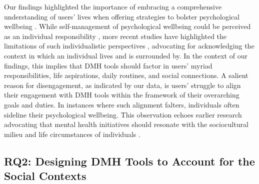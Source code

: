 Our findings highlighted the importance of embracing a comprehensive understanding of users' lives when offering strategies to bolster psychological wellbeing \cite{pendse2022treatment, allen2014social, slavich2020social, murnane2018personal}. While self-management of psychological wellbeing could be perceived as an individual responsibility \cite{lorig2003self}, more recent studies have highlighted the limitations of such individualistic perspectives \cite{sallis2015ecological, murnane2018personal}, advocating for acknowledging the context in which an individual lives and is surrounded by.
In the context of our findings, this implies that DMH tools should factor in users' myriad responsibilities, life aspirations, daily routines, and social connections. A salient reason for disengagement, as indicated by our data, is users' struggle to align their engagement with DMH tools within the framework of their overarching goals and duties. In instances where such alignment falters, individuals often sideline their psychological wellbeing. This observation echoes earlier research advocating that mental health initiatives should resonate with the sociocultural milieu and life circumstances of individuals \cite{slavich2020social, slavich2023social, allen2014social, glanz2008health, tachtler2021unaccompanied, oguamanam2023intersectional, murnane2018personal}.


\subsection{RQ2: Designing DMH Tools to Account for the Social Contexts}


